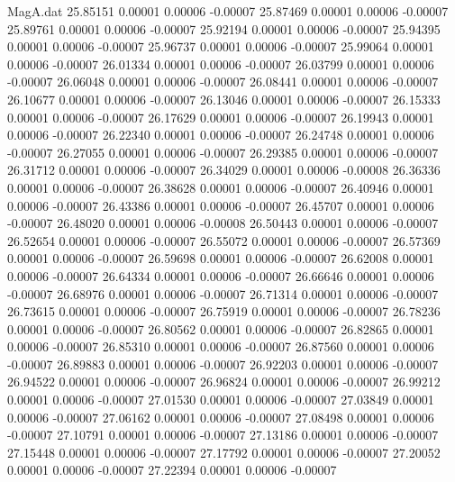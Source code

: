 \begin{filecontents}{MagA.dat}
  25.85151    0.00001    0.00006   -0.00007
  25.87469    0.00001    0.00006   -0.00007
  25.89761    0.00001    0.00006   -0.00007
  25.92194    0.00001    0.00006   -0.00007
  25.94395    0.00001    0.00006   -0.00007
  25.96737    0.00001    0.00006   -0.00007
  25.99064    0.00001    0.00006   -0.00007
  26.01334    0.00001    0.00006   -0.00007
  26.03799    0.00001    0.00006   -0.00007
  26.06048    0.00001    0.00006   -0.00007
  26.08441    0.00001    0.00006   -0.00007
  26.10677    0.00001    0.00006   -0.00007
  26.13046    0.00001    0.00006   -0.00007
  26.15333    0.00001    0.00006   -0.00007
  26.17629    0.00001    0.00006   -0.00007
  26.19943    0.00001    0.00006   -0.00007
  26.22340    0.00001    0.00006   -0.00007
  26.24748    0.00001    0.00006   -0.00007
  26.27055    0.00001    0.00006   -0.00007
  26.29385    0.00001    0.00006   -0.00007
  26.31712    0.00001    0.00006   -0.00007
  26.34029    0.00001    0.00006   -0.00008
  26.36336    0.00001    0.00006   -0.00007
  26.38628    0.00001    0.00006   -0.00007
  26.40946    0.00001    0.00006   -0.00007
  26.43386    0.00001    0.00006   -0.00007
  26.45707    0.00001    0.00006   -0.00007
  26.48020    0.00001    0.00006   -0.00008
  26.50443    0.00001    0.00006   -0.00007
  26.52654    0.00001    0.00006   -0.00007
  26.55072    0.00001    0.00006   -0.00007
  26.57369    0.00001    0.00006   -0.00007
  26.59698    0.00001    0.00006   -0.00007
  26.62008    0.00001    0.00006   -0.00007
  26.64334    0.00001    0.00006   -0.00007
  26.66646    0.00001    0.00006   -0.00007
  26.68976    0.00001    0.00006   -0.00007
  26.71314    0.00001    0.00006   -0.00007
  26.73615    0.00001    0.00006   -0.00007
  26.75919    0.00001    0.00006   -0.00007
  26.78236    0.00001    0.00006   -0.00007
  26.80562    0.00001    0.00006   -0.00007
  26.82865    0.00001    0.00006   -0.00007
  26.85310    0.00001    0.00006   -0.00007
  26.87560    0.00001    0.00006   -0.00007
  26.89883    0.00001    0.00006   -0.00007
  26.92203    0.00001    0.00006   -0.00007
  26.94522    0.00001    0.00006   -0.00007
  26.96824    0.00001    0.00006   -0.00007
  26.99212    0.00001    0.00006   -0.00007
  27.01530    0.00001    0.00006   -0.00007
  27.03849    0.00001    0.00006   -0.00007
  27.06162    0.00001    0.00006   -0.00007
  27.08498    0.00001    0.00006   -0.00007
  27.10791    0.00001    0.00006   -0.00007
  27.13186    0.00001    0.00006   -0.00007
  27.15448    0.00001    0.00006   -0.00007
  27.17792    0.00001    0.00006   -0.00007
  27.20052    0.00001    0.00006   -0.00007
  27.22394    0.00001    0.00006   -0.00007

\end{filecontents}
